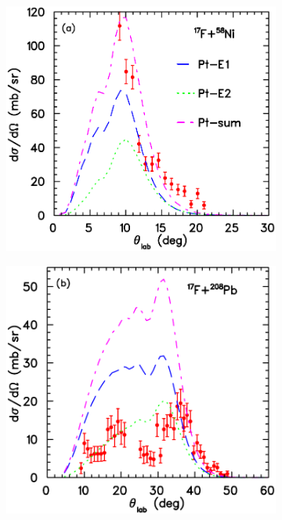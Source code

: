 \documentclass[a4paper,12pt,oneside]{book}
\begin{document}
\begin{figure}[H]
\centering
    \begin{subfigure}[t]{0.45\textwidth}
        \centering
        \includegraphics[scale=0.5, width=.97\columnwidth]{figs/17F_58Ni.png}
        \caption{}
        \label{subfig:dist_ang_2_a}
    \end{subfigure}%
    \hspace{0.5cm}
    \begin{subfigure}[t]{0.45\textwidth}
        \centering
        \includegraphics[scale=0.5, width=.97\columnwidth]{figs/17F_208Pb.png}

\end{subfigure}
\end{figure}
\end{document}
